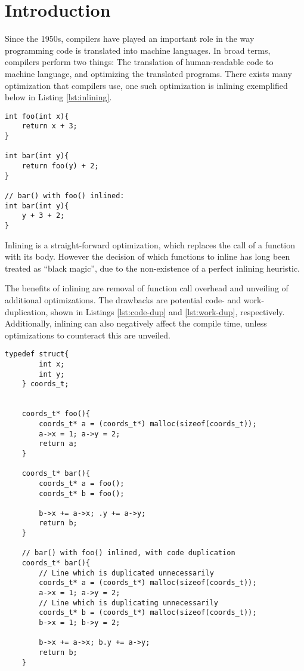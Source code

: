 
\section{Introduction}
\label{introduction}

Since the 1950s, compilers have played an important role in the way programming
code is translated into machine languages. In broad terms, compilers perform two
things: The translation of human-readable code to machine language, and
optimizing the translated programs. There exists many optimization that
compilers use, one such optimization is inlining exemplified below in Listing
\ref{lst:inlining}.

\begin{lstlisting}[caption={Function inlining}, label={lst:inlining},
style=customcpp]
int foo(int x){
	return x + 3;
}

int bar(int y){
	return foo(y) + 2;
}

// bar() with foo() inlined:
int bar(int y){
	y + 3 + 2;
}
\end{lstlisting}

Inlining is a straight-forward optimization, which replaces the call of a
function with its body. However the decision of which functions to inline has
long been treated as ``black magic'', due to the non-existence of a perfect
inlining heuristic.

The benefits of inlining are removal of function call overhead and unveiling of
additional optimizations. The drawbacks are potential code- and work-
duplication, shown in Listings \ref{lst:code-dup} and \ref{lst:work-dup},
respectively. Additionally, inlining can also negatively affect the compile
time, unless optimizations to counteract this are unveiled.

\begin{lstlisting}[caption={Code duplication through inlining},
label={lst:code-dup}, style=customcpp]
	typedef struct{
		int x;
		int y;
	} coords_t;


	coords_t* foo(){
		coords_t* a = (coords_t*) malloc(sizeof(coords_t));
		a->x = 1; a->y = 2;
		return a;
	}

	coords_t* bar(){
		coords_t* a = foo();
		coords_t* b = foo();

		b->x += a->x; .y += a->y;
		return b;
	}

	// bar() with foo() inlined, with code duplication
	coords_t* bar(){
		// Line which is duplicated unnecessarily
		coords_t* a = (coords_t*) malloc(sizeof(coords_t));
		a->x = 1; a->y = 2;
		// Line which is duplicating unnecessarily
		coords_t* b = (coords_t*) malloc(sizeof(coords_t));
		b->x = 1; b->y = 2;

		b->x += a->x; b.y += a->y;
		return b;
	}
\end{lstlisting}

